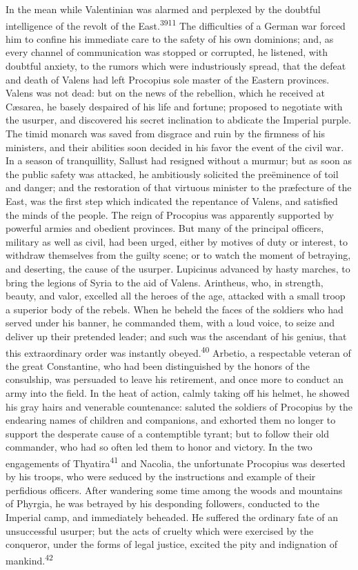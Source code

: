 In the mean while Valentinian was alarmed and perplexed by the
doubtful intelligence of the revolt of the East.\textsuperscript{3911} The
difficulties of a German war forced him to confine his immediate
care to the safety of his own dominions; and, as every channel of
communication was stopped or corrupted, he listened, with
doubtful anxiety, to the rumors which were industriously spread,
that the defeat and death of Valens had left Procopius sole
master of the Eastern provinces. Valens was not dead: but on the
news of the rebellion, which he received at Cæsarea, he basely
despaired of his life and fortune; proposed to negotiate with the
usurper, and discovered his secret inclination to abdicate the
Imperial purple. The timid monarch was saved from disgrace and
ruin by the firmness of his ministers, and their abilities soon
decided in his favor the event of the civil war. In a season of
tranquillity, Sallust had resigned without a murmur; but as soon
as the public safety was attacked, he ambitiously solicited the
preëminence of toil and danger; and the restoration of that
virtuous minister to the præfecture of the East, was the first
step which indicated the repentance of Valens, and satisfied the
minds of the people. The reign of Procopius was apparently
supported by powerful armies and obedient provinces. But many of
the principal officers, military as well as civil, had been
urged, either by motives of duty or interest, to withdraw
themselves from the guilty scene; or to watch the moment of
betraying, and deserting, the cause of the usurper. Lupicinus
advanced by hasty marches, to bring the legions of Syria to the
aid of Valens. Arintheus, who, in strength, beauty, and valor,
excelled all the heroes of the age, attacked with a small troop a
superior body of the rebels. When he beheld the faces of the
soldiers who had served under his banner, he commanded them, with
a loud voice, to seize and deliver up their pretended leader; and
such was the ascendant of his genius, that this extraordinary
order was instantly obeyed.\textsuperscript{40} Arbetio, a respectable veteran of
the great Constantine, who had been distinguished by the honors
of the consulship, was persuaded to leave his retirement, and
once more to conduct an army into the field. In the heat of
action, calmly taking off his helmet, he showed his gray hairs
and venerable countenance: saluted the soldiers of Procopius by
the endearing names of children and companions, and exhorted them
no longer to support the desperate cause of a contemptible
tyrant; but to follow their old commander, who had so often led
them to honor and victory. In the two engagements of Thyatira\textsuperscript{41}
and Nacolia, the unfortunate Procopius was deserted by his
troops, who were seduced by the instructions and example of their
perfidious officers. After wandering some time among the woods
and mountains of Phyrgia, he was betrayed by his desponding
followers, conducted to the Imperial camp, and immediately
beheaded. He suffered the ordinary fate of an unsuccessful
usurper; but the acts of cruelty which were exercised by the
conqueror, under the forms of legal justice, excited the pity and
indignation of mankind.\textsuperscript{42}

